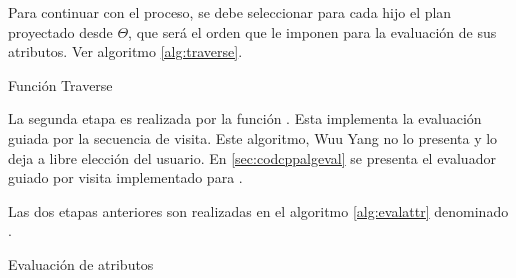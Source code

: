 Para continuar con el proceso, se debe seleccionar para cada hijo el plan proyectado desde $\Theta$, que será el orden que le imponen para la evaluación de sus atributos. Ver algoritmo \ref{alg:traverse}.

\begin{algorithm}[!ht]

\caption{\label{alg:traverse} Función Traverse}
\end{algorithm}

La segunda etapa es realizada por la función . Esta implementa la evaluación guiada por la secuencia de visita. Este algoritmo, Wuu Yang no lo presenta y lo deja a libre elección del usuario. En \ref{sec:codcppalgeval} se presenta el evaluador guiado por visita implementado para \maggen. 


Las dos etapas anteriores son realizadas en el algoritmo \ref{alg:evalattr} denominado . 

\begin{algorithm}[!ht]

\caption{\label{alg:evalattr} Evaluación de atributos}
\end{algorithm}